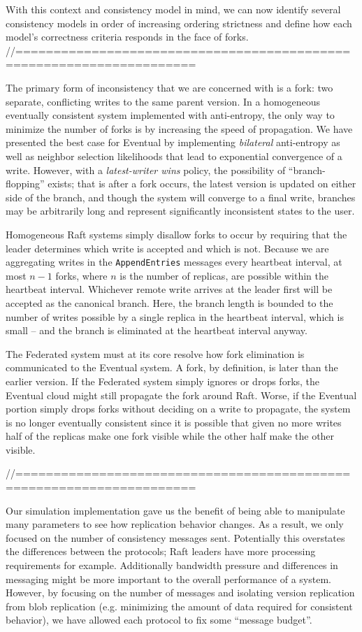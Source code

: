 With this context and consistency model in mind, we can now identify several consistency models in order of increasing ordering strictness and define how each model's correctness criteria responds in the face of forks.
//=====================================================================

The primary form of inconsistency that we are concerned with is a fork: two
separate, conflicting writes to the same parent version.
In a homogeneous eventually consistent system implemented with anti-entropy,
the only way to minimize the number of forks is by increasing the speed of
propagation.
We have presented the best case for Eventual by implementing
\textit{bilateral} anti-entropy as well as neighbor selection likelihoods that
lead to exponential convergence of a write.
However, with a \textit{latest-writer wins} policy, the possibility of
``branch-flopping'' exists; that is after a fork occurs, the latest version is
updated on either side of the branch, and though the system will converge to a
final write, branches may be arbitrarily long and represent significantly
inconsistent states to the user.

Homogeneous Raft systems simply disallow forks to
occur by requiring that the leader determines which write is accepted and
which is not.
Because we are aggregating writes in the \texttt{AppendEntries} messages every
heartbeat interval, at most $n-1$ forks, where $n$ is the number of replicas,
are possible within the heartbeat interval.
Whichever remote write arrives at the leader first will be accepted as the
canonical branch.
Here, the branch length is bounded to the number of writes possible by a
single replica in the heartbeat interval, which is small -- and the branch is
eliminated at the heartbeat interval anyway.

The Federated system must at its core resolve how fork elimination is
communicated to the Eventual system.
A fork, by definition, is later than the earlier version.
If the Federated system simply ignores or drops forks, the Eventual cloud
might still propagate the fork around Raft.
Worse, if the Eventual portion simply drops forks without deciding on a write
to propagate, the system is no longer eventually consistent since it is
possible that given no more writes half of the replicas make one fork visible
while the other half make the other visible.

//=====================================================================

Our simulation implementation gave us the benefit of being able to manipulate
many parameters to see how replication behavior changes.
As a result, we only focused on the number of consistency messages sent.
Potentially this overstates the differences between the protocols; Raft
leaders have more processing requirements for example.
Additionally bandwidth pressure and differences in messaging might be more
important to the overall performance of a system.
However, by focusing on the number of messages and isolating version
replication from blob replication (e.g.
minimizing the amount of data required for consistent behavior), we have
allowed each protocol to fix some ``message budget''.

